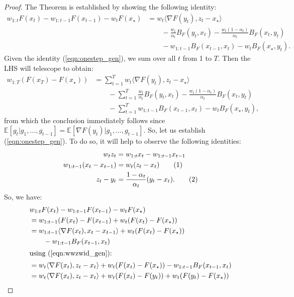 \documentclass{article}
\newcommand\numberthis{\addtocounter{equation}{1}\tag{\theequation}}
\begin{document}
\begin{proof}
The Theorem is established by showing the following identity:
\begin{align}
    w_{1:t} F(x_t) - w_{1:t-1} F(x_{t-1}) - w_t F(x_\star)&= w_t\langle \nabla F(y_t), z_t -x_\star\rangle\nonumber\\
    &\qquad-\frac{w_t}{\alpha_t}B_F(y_t,x_t) - \frac{w_t(1-\alpha_t)}{\alpha_t}B_F(x_t, y_t)\nonumber \\
    &\qquad- w_{1:t-1} B_F(x_{t-1},x_t) - w_t B_F(x_\star, y_t). \label{eqn:onestep_gen}
\end{align}
Given the identity (\ref{eqn:onestep_gen}), we sum over all $t$ from 1 to $T$. Then the LHS will telescope to obtain:
\begin{align*}
    w_{1:T}(F(x_T) - F(x_\star))&= \sum_{t=1}^T  w_t\langle \nabla F(y_t), z_t - x_\star\rangle\\
    &\qquad-\sum_{t=1}^T\frac{w_t}{\alpha_t}B_F(y_t,x_t) - \frac{w_t(1-\alpha_t)}{\alpha_t}B_F(x_t, y_t) \\
    &\qquad- \sum_{t=1}^Tw_{1:t-1} B_F(x_{t-1},x_t) - w_t B_F(x_\star, y_t),
\end{align*}
from which the conclusion immediately follows since $\mathbb{E}[g_t|g_1,\dots,g_{t-1}]=\mathbb{E}[\nabla F(y_t)|g_1,\dots,g_{t-1}]$. So, let us establish (\ref{eqn:onestep_gen}). To do so, it will help to observe the following identities:
\begin{align*}
    w_t z_t &= w_{1:t} x_t - w_{1:t-1} x_{t-1}\\
    w_{1:t-1}(x_t-x_{t-1})&=w_t(z_t -x_t)\numberthis\label{eqn:wwzwid_gen}\\
   z_t - y_t &= \frac{1-\alpha_t}{\alpha_t}(y_t - x_t). \numberthis\label{eqn:zyyxid_gen}
\end{align*}
So, we have:
\begin{align*}
    & w_{1:t} F(x_t) -  w_{1:t-1} F(x_{t-1}) - w_t F(x_\star)\\
    &= w_{1:t-1} (F(x_t) - F(x_{t-1}) + w_t(F(x_t) - F(x_\star))\\
    &= w_{1:t-1} \langle \nabla F(x_t), x_t -x_{t-1}\rangle  +w_t(F(x_t) - F(x_\star))\\
    &\qquad-w_{1:t-1} B_F(x_{t-1}, x_t)\\
    \intertext{using (\ref{eqn:wwzwid_gen}):}
    &= w_t \langle \nabla F(x_t), z_t - x_t\rangle +w_t(F(x_t) - F(x_\star))-w_{1:t-1} B_F(x_{t-1}, x_t)\\
    &= w_t \langle \nabla F(x_t), z_t - x_t\rangle 
 +w_t (F(x_t) - F(y_t)) + w_t(F(y_t) - F(x_\star))\\

\end{align*}
\end{proof}
\end{document}
